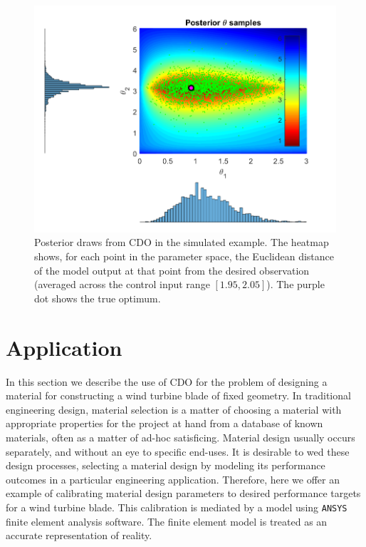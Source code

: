 \documentclass{article}
\begin{document}
\begin{figure}
\centering
\includegraphics[width=.75\linewidth]{FIG_toy_sim_model_results}
\captionsetup{width=.75\linewidth}
\caption{Posterior draws from CDO in the simulated example. The heatmap shows, for each point in the parameter space, the Euclidean distance of the model output at that point from the desired observation (averaged across the control input range $[1.95,2.05]$). The purple dot shows the true optimum.}
\label{fig:toy_sim_results}
\end{figure}



\section{Application}\label{application}

In this section we describe the use of CDO for the problem of designing a material for constructing a wind turbine blade of fixed geometry. 
%
In traditional engineering design, material selection is a matter of choosing a material with appropriate properties for the project at hand from a database of known materials, often as a matter of ad-hoc satisficing. 
%
Material design usually occurs separately, and without an eye to specific end-uses. 
%
It is desirable to wed these design processes, selecting a material design by modeling its performance outcomes in a particular engineering application. 
%
Therefore, here we offer an example of calibrating material design parameters to desired performance targets for a wind turbine blade. 
%
This calibration is mediated by a model using \texttt{ANSYS} finite element analysis software. 
%
The finite element model is treated as an accurate representation of reality. %
\end{document}
